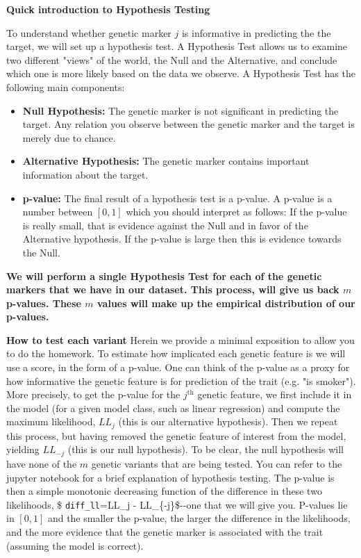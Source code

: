 \documentclass[11pt]{article}
\providecommand{\tightlist}{%
      \setlength{\itemsep}{0pt}\setlength{\parskip}{0pt}}
\begin{document}
\textbf{Quick introduction to Hypothesis Testing}

To understand whether genetic marker \(j\) is informative in predicting
the the target, we will set up a hypothesis test. A Hypothesis Test
allows us to examine two different "views" of the world, the Null and
the Alternative, and conclude which one is more likely based on the data
we observe. A Hypothesis Test has the following main components:

\begin{itemize}
\tightlist
\item
  \textbf{Null Hypothesis:} The genetic marker is not significant in
  predicting the target. Any relation you observe between the genetic
  marker and the target is merely due to chance.
\item
  \textbf{Alternative Hypothesis:} The genetic marker contains important
  information about the target.
\item
  \textbf{p-value:} The final result of a hypothesis test is a p-value.
  A p-value is a number between \([0, 1]\) which you should interpret as
  follows: If the p-value is really small, that is evidence against the
  Null and in favor of the Alternative hypothesis. If the p-value is
  large then this is evidence towards the Null.
\end{itemize}

\textbf{We will perform a single Hypothesis Test for each of the genetic
markers that we have in our dataset. This process, will give us back
\(m\) p-values. These \(m\) values will make up the empirical
distribution of our p-values.}

\textbf{How to test each variant} Herein we provide a minimal exposition
to allow you to do the homework. To estimate how implicated each genetic
feature is we will use a score, in the form of a p-value. One can think
of the p-value as a proxy for how informative the genetic feature is for
prediction of the trait (e.g. "is smoker"). More precisely, to get the
p-value for the \(j^{\text{th}}\) genetic feature, we first include it
in the model (for a given model class, such as linear regression) and
compute the maximum likelihood, \(LL_{j}\) (this is our alternative
hypothesis). Then we repeat this process, but having removed the genetic
feature of interest from the model, yielding \(LL_{-j}\) (this is our
null hypothesis). To be clear, the null hypothesis will have none of the
\(m\) genetic variants that are being tested. You can refer to the
jupyter notebook for a brief explanation of hypothesis testing. The
p-value is then a simple monotonic decreasing function of the difference
in these two likelihoods, \$ \verb|diff_ll|=LL\_j - LL\_\{-j\}\$-\/-one
that we will give you. P-values lie in \([0,1]\) and the smaller the
p-value, the larger the difference in the likelihoods, and the more
evidence that the genetic marker is associated with the trait (assuming
the model is correct).
\end{document}
